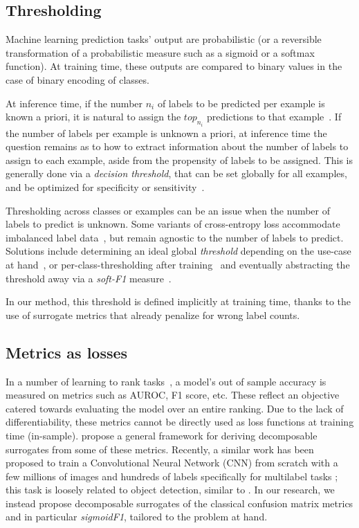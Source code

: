 \subsection{Thresholding}
\label{subsec:thresh}

Machine learning prediction tasks' output are probabilistic (or a reversible transformation of a probabilistic measure such as a sigmoid or a softmax function).
At training time, these outputs are compared to binary
values in the case of binary encoding of classes.

At inference time, if the number $n_i$ of labels to be predicted per example is known a priori, it is natural to assign the $top_{n_i}$ predictions to that example~\cite{lossTopKError, topKmulticlassSVM}.
If the number of labels per example is unknown a priori,  at inference time the question remains as to how to extract information about the number of labels to assign to each example, aside from the propensity of labels to be assigned.
This is generally done via a \emph{decision threshold}, that can be set globally for all examples, and be optimized for specificity or sensitivity~\cite{decisionThreshold}.

Thresholding across classes or examples can be an issue when the number of labels to predict is unknown. Some variants of cross-entropy loss accommodate imbalanced label data~\cite{focalLoss}, but remain agnostic to the number of labels to predict.
Solutions include determining an ideal global \emph{threshold} depending on the use-case at hand~\cite{threshForF1}, or per-class-thresholding after training~\cite{moviePosters} and eventually abstracting the threshold away via a \emph{soft-F1} measure~\cite{softF1}.

In our method, this threshold is defined implicitly at training time, thanks to the use of surrogate metrics that already penalize for wrong label counts.


\subsection{Metrics as losses}

In a number of learning to rank tasks~\cite{LTR}, a model's out of sample accuracy is measured on metrics such as AUROC, F1 score, etc. These reflect an objective catered towards evaluating the model over an entire ranking. Due to the lack of differentiability, these metrics cannot be directly used as loss
functions at training time (in-sample). \citet{optimizableLosses} propose a general framework for deriving
decomposable surrogates from some of these metrics.
Recently, a similar work has been proposed to train a Convolutional
Neural Network (CNN) from scratch with a few millions of images and hundreds
of labels specifically for multilabel tasks \cite{tencent}; this task is loosely related to object detection, similar to \cite{multitaskLabelImages}.
In our research, we instead propose decomposable surrogates of the classical confusion matrix metrics and in particular \emph{sigmoidF1}, tailored to the problem at hand.

